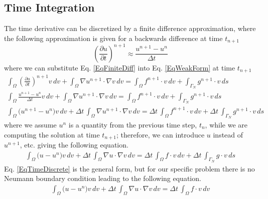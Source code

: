 \documentclass[12pt,3p]{article}
\begin{document}
\subsection{Time Integration}
\vspace{-1ex}
The time derivative can be discretized by a finite difference approximation, where the following approximation is given for a backwards difference at time $t_{n+1}$
\begin{equation}\label{EqFiniteDiff}
\left(\frac{\partial u}{\partial t}\right)^{n+1} \approx \frac{u^{n+1}-u^n}{\Delta t}
\end{equation}
where we can substitute Eq. \ref{EqFiniteDiff} into Eq. \ref{EqWeakForm} at time $t_{ n+1}$
\begin{align*}
\int_{\Omega} \left( \frac{\partial u}{\partial t} \right)^{n+1} v \, dv 
+ \int_{\Omega} \nabla u^{n+1} \cdot \nabla v \, dv
	= \int_{\Omega} f^{n+1} \cdot v \, dv + \int_{\Gamma_N} g^{n+1} \cdot v \, ds \\
\int_{\Omega} \frac{u^{n+1}-u^n}{\Delta t} v \, dv 
+ \int_{\Omega} \nabla u^{n+1} \cdot \nabla v \, dv
	= \int_{\Omega} f^{n+1} \cdot v \, dv + \int_{\Gamma_N} g^{n+1} \cdot v \, ds \\
\int_{\Omega} \big( u^{n+1}-u^n \big) v \, dv 
+ \Delta t \, \int_{\Omega} \nabla u^{n+1} \cdot \nabla v \, dv
	= \Delta t \, \int_{\Omega} f^{n+1} \cdot v \, dv + \Delta t \, \int_{\Gamma_N} g^{n+1} \cdot v \, ds 
\end{align*}
where we assume $u^n$ is a quantity from the previous time step, $t_n$, while we are computing the solution at time $t_{n+1}$; therefore, we can introduce $u$ instead of $u^{n+1}$, etc. giving the following equation.
\begin{align}\label{EqTimeDiscrete}
\int_{\Omega} \big( u -u^n \big) v \, dv 
+ \Delta t \, \int_{\Omega} \nabla u \cdot \nabla v \, dv
	= \Delta t \, \int_{\Omega} f \cdot v \, dv + \Delta t \, \int_{\Gamma_N} g \cdot v \, ds 
\end{align}
Eq. \ref{EqTimeDiscrete} is the general form, but for our specific problem there is no Neumann boundary condition leading to the following equation. 
\begin{align}\label{EqTimeDisSpec}
\int_{\Omega} \big( u -u^n \big) v \, dv 
+ \Delta t \, \int_{\Omega} \nabla u \cdot \nabla v \, dv
	= \Delta t \, \int_{\Omega} f \cdot v \, dv 
\end{align}

\end{document}
